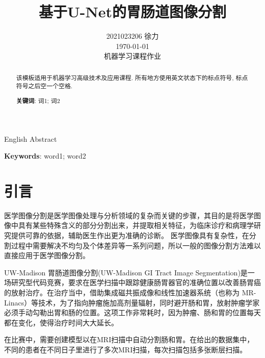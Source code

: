 \documentclass[letterpaper, 10pt, conference, twoside]{ieeeconf}
\title{\LARGE \bf
基于U-Net的胃肠道图像分割
}
\author{2021023206 \quad 徐力\\ \today\\ 机器学习课程作业}
\begin{document}
\maketitle



\begin{abstract}
该模板适用于机器学习高级技术及应用课程. 所有地方使用英文状态下的标点符号, 标点符号之后空一个空格.

\vspace{1ex}\noindent\textbf{关键词}: 词1; 词2

\end{abstract}

\begin{eabstract}
	English Abstract
	
\vspace{1ex}\noindent\textbf{Keywords}: word1; word2
\end{eabstract}


\section{引言}
医学图像分割是医学图像处理与分析领域的复杂而关键的步骤，其目的是将医学图像中具有某些特殊含义的部分分割出来，并提取相关特征，为临床诊疗和病理学研究提供可靠的依据，辅助医生作出更为准确的诊断。 医学图像具有复杂性，在分割过程中需要解决不均匀及个体差异等一系列问题，所以一般的图像分割方法难以直接应用于医学图像分割。

UW-Madison 胃肠道图像分割(UW-Madison GI Tract Image Segmentation)是一场研究型代码竞赛，要求在医学扫描中跟踪健康肠胃器官的准确位置以改善肠胃癌的放射治疗。在治疗当中，借助集成磁共振成像和线性加速器系统（也称为 MR-Linacs）等技术，为了指向肿瘤施加高剂量辐射，同时避开肠和胃，放射肿瘤学家必须手动勾勒出胃和肠的位置。这项工作非常耗时，因为肿瘤、肠和胃的位置每天都在变化，使得治疗时间大大延长。

在比赛中，需要创建模型以在MRI扫描中自动分割肠和胃。在给出的数据集中，不同的患者在不同日子里进行了多次MRI扫描，每次扫描包括多张断层扫描。
\end{document}
